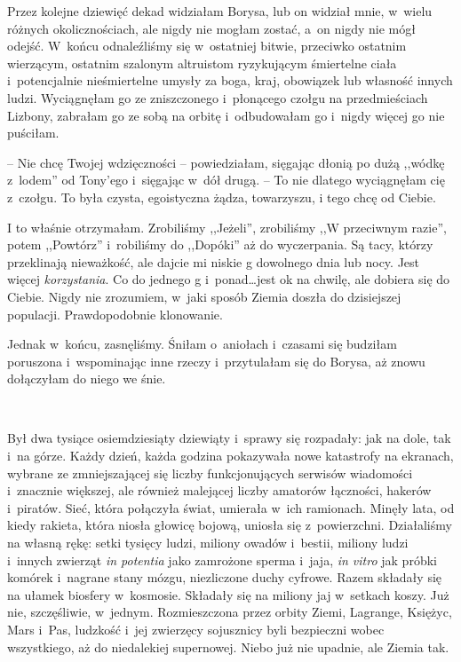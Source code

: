 \documentclass[oneside,polish,11pt,sfheadings]{mwbk}
\begin{document}
Przez kolejne dziewięć dekad widziałam Borysa, lub on widział mnie, w~wielu różnych okolicznościach, ale nigdy nie mogłam zostać, a~on nigdy
nie mógł odejść. W~końcu odnaleźliśmy się w~ostatniej bitwie, przeciwko
ostatnim wierzącym, ostatnim szalonym altruistom ryzykującym śmiertelne
ciała i~potencjalnie nieśmiertelne umysły za boga, kraj, obowiązek lub
własność innych ludzi. Wyciągnęłam go ze zniszczonego i~płonącego czołgu
na przedmieściach Lizbony, zabrałam go ze sobą na orbitę i~odbudowałam
go i~nigdy więcej go nie puściłam.

-- Nie chcę Twojej wdzięczności -- powiedziałam, sięgając dłonią po dużą
,,wódkę z~lodem'' od Tony'ego i~sięgając w~dół drugą. -- To nie dlatego
wyciągnęłam cię z~czołgu. To była czysta, egoistyczna żądza, towarzyszu,
i tego chcę od Ciebie.

I to właśnie otrzymałam. Zrobiliśmy ,,Jeżeli'', zrobiliśmy ,,W
przeciwnym razie'', potem ,,Powtórz'' i~robiliśmy do ,,Dopóki'' aż do
wyczerpania. Są tacy, którzy przeklinają nieważkość, ale dajcie mi
niskie g dowolnego dnia lub nocy. Jest więcej \textit{korzystania}. Co do
jednego g i~ponad\ldots  jest ok na chwilę, ale dobiera się do Ciebie. Nigdy
nie zrozumiem, w~jaki sposób Ziemia doszła do dzisiejszej populacji.
Prawdopodobnie klonowanie.

Jednak w~końcu, zasnęliśmy. Śniłam o~aniołach i~czasami się budziłam
poruszona i~wspominając inne rzeczy i~przytulałam się do Borysa, aż
znowu dołączyłam do niego we śnie.

~

Był dwa tysiące osiemdziesiąty dziewiąty i~sprawy się rozpadały: jak na
dole, tak i~na górze. Każdy dzień, każda godzina pokazywała nowe
katastrofy na ekranach, wybrane ze zmniejszającej się liczby
funkcjonujących serwisów wiadomości i~znacznie większej, ale również
malejącej liczby amatorów łączności, hakerów i~piratów. Sieć, która
połączyła świat, umierała w~ich ramionach. Minęły lata, od kiedy
rakieta, która niosła głowicę bojową, uniosła się z~powierzchni.
Działaliśmy na własną rękę: setki tysięcy ludzi, miliony owadów i~bestii, miliony ludzi i~innych zwierząt \textit{in potentia} jako
zamrożone sperma i~jaja, \textit{in vitro} jak próbki komórek i~nagrane
stany mózgu, niezliczone duchy cyfrowe. Razem składały się na ułamek
biosfery w~kosmosie. Składały się na miliony jaj w~setkach koszy. Już
nie, szczęśliwie, w~jednym. Rozmieszczona przez orbity Ziemi, Lagrange,
Księżyc, Mars i~Pas, ludzkość i~jej zwierzęcy sojusznicy byli bezpieczni
wobec wszystkiego, aż do niedalekiej supernowej. Niebo już nie upadnie,
ale Ziemia tak.
\end{document}
